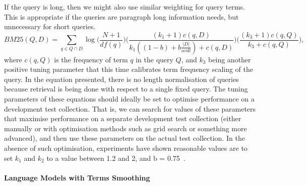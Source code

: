 If the query is long, then we might also use similar weighting for query terms. This is appropriate if the queries are paragraph long information needs, but unnecessary for short queries.
\begin{equation}
BM25(Q,D)=\sum\limits_{q \in Q\cap D}\log\Bigg(\frac{N+1}{df(q)}\Bigg)\Bigg(\frac{(k_{1}+1)c(q,D)}{k_{1}((1-b)+b\frac{|D|}{avdl})+c(q,D)}\Bigg)\Bigg(\frac{(k_{3}+1)c(q,Q)}{k_{3}+c(q,Q)}\Bigg),
\label{eq:idfbm25}
\end{equation}
where $ c(q,Q) $ is the frequency of term $ q $ in the query $ Q $, and $ k_{3} $ being another positive tuning parameter that this time calibrates term frequency scaling of the query. In the equation presented, there is no length normalisation of
queries because retrieval is being done with respect to a single fixed query. The tuning parameters of these equations should ideally be set to optimise performance on a development test collection. That is, we can search for values of these parameters that maximise performance on a separate development test collection (either manually or with optimisation methods such as grid search or something more advanced), and then use these parameters on the actual test collection. In the absence of such optimisation, experiments have shown reasonable values are to set $ k_{1} $ and $ k_{2} $ to a value between 1.2 and 2, and b = 0.75~\citep{manning2008introduction}.

\paragraph{Language Models with Terms Smoothing}
\ \\
